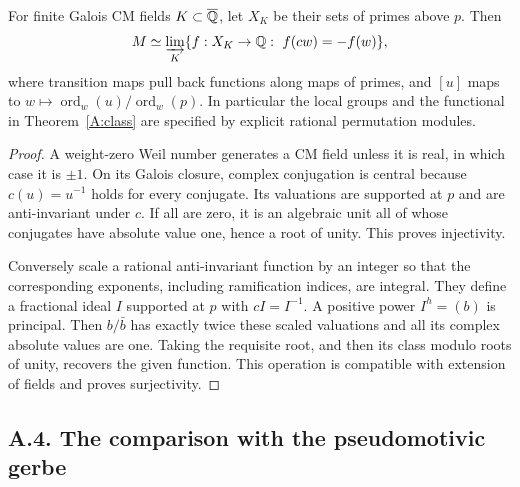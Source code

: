 \begin{proposition}
\label{A:valuations}
For finite Galois CM fields $K\subset\overline{\mathbb Q}$, let $X_K$
be their sets of primes above $p$. Then
\[
 M\simeq\varinjlim_K
 \{f:X_K\to\mathbb Q:\ f(cw)=-f(w)\},
\]
where transition maps pull back functions along maps of primes,
and $[u]$ maps to $w\mapsto\operatorname{ord}_w(u)/
\operatorname{ord}_w(p)$. In particular the local groups and the
functional in Theorem~\ref{A:class} are specified by explicit
rational permutation modules.
\end{proposition}
\begin{proof}
A weight-zero Weil number generates a CM field unless it is real,
in which case it is $\pm1$. On its Galois closure, complex
conjugation is central because $c(u)=u^{-1}$ holds for every
conjugate. Its valuations are supported at $p$ and are
anti-invariant under $c$. If all are zero, it is an algebraic unit
all of whose conjugates have absolute value one, hence a root of
unity. This proves injectivity.

Conversely scale a rational anti-invariant function by an integer
so that the corresponding exponents, including ramification
indices, are integral. They define a fractional ideal $I$ supported
at $p$ with $cI=I^{-1}$. A positive power $I^h=(b)$ is principal.
Then $b/\bar b$ has exactly twice these scaled valuations and
all its complex absolute values are one. Taking the requisite
root, and then its class modulo roots of unity, recovers the given
function. This operation is compatible with extension of fields
and proves surjectivity.
\end{proof}

\subsection{A.4. The comparison with the pseudomotivic gerbe}

